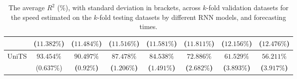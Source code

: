 \begin{table}[!ht]
{\begin{tabular}{|c|c|c|c|c|c|c|c|}
			 & ($11.382\%$) & ($11.484\%$) & ($11.516\%$) & ($11.581\%$) & ($11.811\%$) & ($12.156\%$) & ($12.476\%$) \\ \hline
			\multirow{2}{*}{UniTS} & $93.454\%$ & $\mathbf{90.497\%}$ & $\mathbf{87.478\%}$ & $\mathbf{84.538\%}$ & $\mathbf{72.886\%}$ & $\mathbf{61.529\%}$ & $\mathbf{56.211\%}$ \\
			 & ($0.637\%$) & \textbf{(}$\mathbf{0.92\%}$\textbf{)} & \textbf{(}$\mathbf{1.206\%}$\textbf{)} & \textbf{(}$\mathbf{1.491\%}$\textbf{)} & \textbf{(}$\mathbf{2.682\%}$\textbf{)} & \textbf{(}$\mathbf{3.893\%}$\textbf{)} & \textbf{(}$\mathbf{3.917\%}$\textbf{)} \\ \hline
		\end{tabular}
	}
	\caption{The average $R^{2}$ (\%), with standard deviation in brackets, across $k$-fold validation datasets for the speed estimated on the $k$-fold testing datasets by different RNN models, and forecasting times.}
	\label{tab:all_speed_R2}
\end{table}